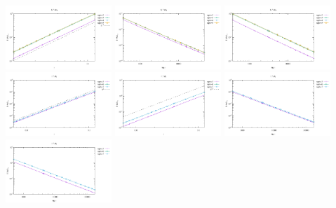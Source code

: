\begin{center}
\includegraphics[width=4cm]{python_codes/fieldstone_120/results/Q1+Q1-pressure-h.pdf}
\includegraphics[width=4cm]{python_codes/fieldstone_120/results/Q1+Q1-velocity-Nfem.pdf}
\includegraphics[width=4cm]{python_codes/fieldstone_120/results/Q1+Q1-pressure-Nfem.pdf}
\\
\includegraphics[width=4cm]{python_codes/fieldstone_120/results/P1+P1-velocity-h.pdf}
\includegraphics[width=4cm]{python_codes/fieldstone_120/results/P1+P1-pressure-h.pdf}
\includegraphics[width=4cm]{python_codes/fieldstone_120/results/P1+P1-velocity-Nfem.pdf}
\includegraphics[width=4cm]{python_codes/fieldstone_120/results/P1+P1-pressure-Nfem.pdf}

\end{center}
